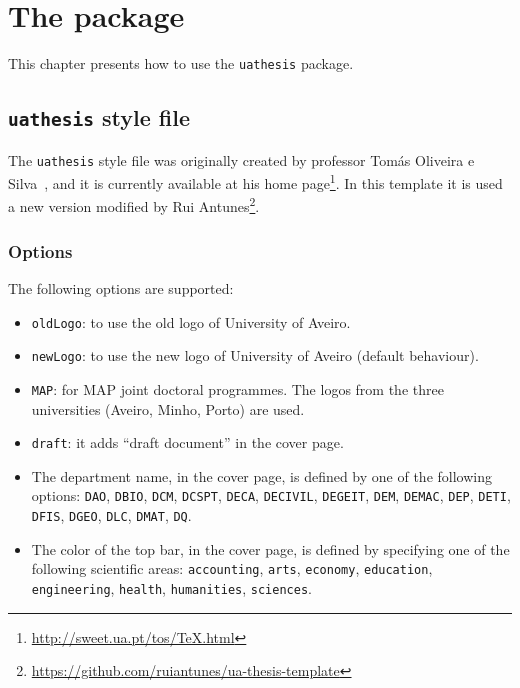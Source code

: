 \chapter{The package}
\label{ch:the-package}

This chapter presents how to use the \verb+uathesis+ package.

\section{\texttt{uathesis} style file}
\label{sec:uathesis-style-file}

The \verb+uathesis+ style file was originally created by professor Tomás Oliveira e Silva~\parencite*{Silva2012a}, and it is currently available at his home page\footnote{\url{http://sweet.ua.pt/tos/TeX.html}}. In this template it is used a new version modified by Rui Antunes\footnote{\url{https://github.com/ruiantunes/ua-thesis-template}}.

\subsection{Options}
\label{ssec:options}

The following options are supported:

\begin{itemize}
\item
\texttt{oldLogo}: to use the old logo of University of Aveiro.
\item
\texttt{newLogo}: to use the new logo of University of Aveiro (default behaviour).
\item
\texttt{MAP}: for MAP joint doctoral programmes. The logos from the three universities (Aveiro, Minho, Porto) are used.
\item
\texttt{draft}: it adds ``draft document'' in the cover page.
\item
The department name, in the cover page, is defined by one of the following options: \texttt{DAO}, \texttt{DBIO}, \texttt{DCM}, \texttt{DCSPT}, \texttt{DECA}, \texttt{DECIVIL}, \texttt{DEGEIT}, \texttt{DEM}, \texttt{DEMAC}, \texttt{DEP}, \texttt{DETI}, \texttt{DFIS}, \texttt{DGEO}, \texttt{DLC}, \texttt{DMAT}, \texttt{DQ}.
\item
The color of the top bar, in the cover page, is defined by specifying one of the following scientific areas: \texttt{accounting}, \texttt{arts}, \texttt{economy}, \texttt{education}, \texttt{engineering}, \texttt{health}, \texttt{humanities}, \texttt{sciences}.
\end{itemize}
